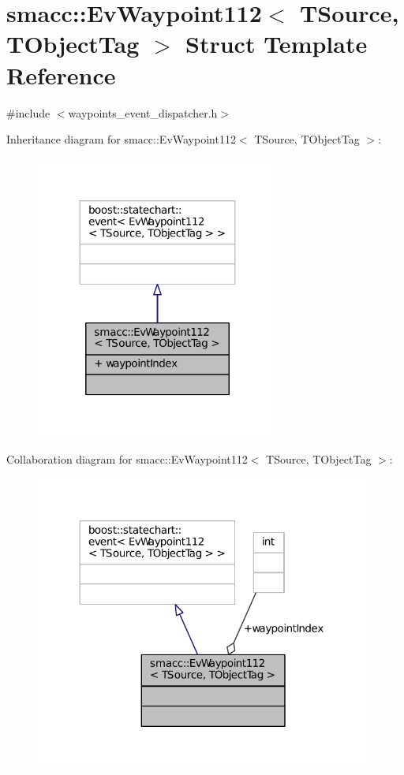 \hypertarget{structsmacc_1_1EvWaypoint112}{}\section{smacc\+:\+:Ev\+Waypoint112$<$ T\+Source, T\+Object\+Tag $>$ Struct Template Reference}
\label{structsmacc_1_1EvWaypoint112}


{\ttfamily \#include $<$waypoints\+\_\+event\+\_\+dispatcher.\+h$>$}



Inheritance diagram for smacc\+:\+:Ev\+Waypoint112$<$ T\+Source, T\+Object\+Tag $>$\+:
\nopagebreak
\begin{figure}[H]
\begin{center}
\leavevmode
\includegraphics[width=227pt]{structsmacc_1_1EvWaypoint112__inherit__graph}
\end{center}
\end{figure}


Collaboration diagram for smacc\+:\+:Ev\+Waypoint112$<$ T\+Source, T\+Object\+Tag $>$\+:
\nopagebreak
\begin{figure}[H]
\begin{center}
\leavevmode
\includegraphics[width=312pt]{structsmacc_1_1EvWaypoint112__coll__graph}
\end{center}
\end{figure}
